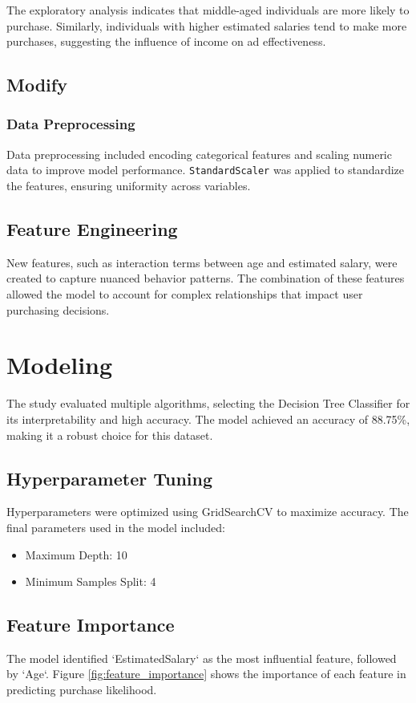 \documentclass[12pt]{article}
\begin{document}
The exploratory analysis indicates that middle-aged individuals are more likely to purchase. Similarly, individuals with higher estimated salaries tend to make more purchases, suggesting the influence of income on ad effectiveness.

\subsection{Modify}
\subsubsection{Data Preprocessing}
Data preprocessing included encoding categorical features and scaling numeric data to improve model performance. \texttt{StandardScaler} was applied to standardize the features, ensuring uniformity across variables.

\subsection{Feature Engineering}
New features, such as interaction terms between age and estimated salary, were created to capture nuanced behavior patterns. The combination of these features allowed the model to account for complex relationships that impact user purchasing decisions.

\section{Modeling}
The study evaluated multiple algorithms, selecting the Decision Tree Classifier for its interpretability and high accuracy. The model achieved an accuracy of 88.75\%, making it a robust choice for this dataset.

\subsection{Hyperparameter Tuning}
Hyperparameters were optimized using GridSearchCV to maximize accuracy. The final parameters used in the model included:
\begin{itemize}
    \item Maximum Depth: 10
    \item Minimum Samples Split: 4
\end{itemize}

\subsection{Feature Importance}
The model identified `EstimatedSalary` as the most influential feature, followed by `Age`. Figure \ref{fig:feature_importance} shows the importance of each feature in predicting purchase likelihood.
\end{document}
